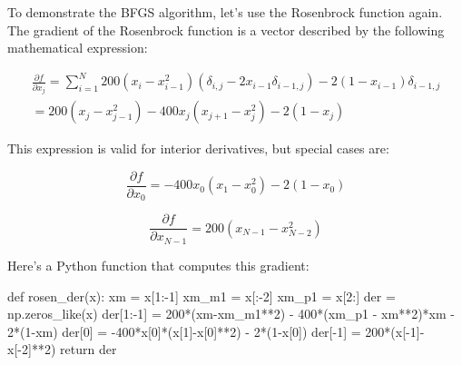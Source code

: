 \documentclass[
  letterpaper,
  DIV=11,
  numbers=noendperiod]{scrreprt}
\newenvironment{Shaded}{\begin{snugshade}}{\end{snugshade}}
\newcommand{\ControlFlowTok}[1]{\textcolor[rgb]{0.00,0.23,0.31}{#1}}
\newcommand{\DecValTok}[1]{\textcolor[rgb]{0.68,0.00,0.00}{#1}}
\newcommand{\KeywordTok}[1]{\textcolor[rgb]{0.00,0.23,0.31}{#1}}
\newcommand{\NormalTok}[1]{\textcolor[rgb]{0.00,0.23,0.31}{#1}}
\newcommand{\OperatorTok}[1]{\textcolor[rgb]{0.37,0.37,0.37}{#1}}
\begin{document}
To demonstrate the BFGS algorithm, let's use the Rosenbrock function
again. The gradient of the Rosenbrock function is a vector described by
the following mathematical expression:

\begin{align}
\frac{\partial f}{\partial x_j} = \sum_{i=1}^{N} 200(x_i - x_{i-1}^2)(\delta_{i,j} - 2x_{i-1}\delta_{i-1,j}) - 2(1 - x_{i-1})\delta_{i-1,j} \\
= 200(x_j - x_{j-1}^2) - 400x_j(x_{j+1} - x_j^2) - 2(1 - x_j)
\end{align}

This expression is valid for interior derivatives, but special cases
are:

\[
\frac{\partial f}{\partial x_0} = -400x_0(x_1 - x_0^2) - 2(1 - x_0)
\]

\[
\frac{\partial f}{\partial x_{N-1}} = 200(x_{N-1} - x_{N-2}^2)
\]

Here's a Python function that computes this gradient:

\begin{Shaded}
\begin{Highlighting}[]
\KeywordTok{def}\NormalTok{ rosen\_der(x):}
\NormalTok{    xm }\OperatorTok{=}\NormalTok{ x[}\DecValTok{1}\NormalTok{:}\OperatorTok{{-}}\DecValTok{1}\NormalTok{]}
\NormalTok{    xm\_m1 }\OperatorTok{=}\NormalTok{ x[:}\OperatorTok{{-}}\DecValTok{2}\NormalTok{]}
\NormalTok{    xm\_p1 }\OperatorTok{=}\NormalTok{ x[}\DecValTok{2}\NormalTok{:]}
\NormalTok{    der }\OperatorTok{=}\NormalTok{ np.zeros\_like(x)}
\NormalTok{    der[}\DecValTok{1}\NormalTok{:}\OperatorTok{{-}}\DecValTok{1}\NormalTok{] }\OperatorTok{=} \DecValTok{200}\OperatorTok{*}\NormalTok{(xm}\OperatorTok{{-}}\NormalTok{xm\_m1}\OperatorTok{**}\DecValTok{2}\NormalTok{) }\OperatorTok{{-}} \DecValTok{400}\OperatorTok{*}\NormalTok{(xm\_p1 }\OperatorTok{{-}}\NormalTok{ xm}\OperatorTok{**}\DecValTok{2}\NormalTok{)}\OperatorTok{*}\NormalTok{xm }\OperatorTok{{-}} \DecValTok{2}\OperatorTok{*}\NormalTok{(}\DecValTok{1}\OperatorTok{{-}}\NormalTok{xm)}
\NormalTok{    der[}\DecValTok{0}\NormalTok{] }\OperatorTok{=} \OperatorTok{{-}}\DecValTok{400}\OperatorTok{*}\NormalTok{x[}\DecValTok{0}\NormalTok{]}\OperatorTok{*}\NormalTok{(x[}\DecValTok{1}\NormalTok{]}\OperatorTok{{-}}\NormalTok{x[}\DecValTok{0}\NormalTok{]}\OperatorTok{**}\DecValTok{2}\NormalTok{) }\OperatorTok{{-}} \DecValTok{2}\OperatorTok{*}\NormalTok{(}\DecValTok{1}\OperatorTok{{-}}\NormalTok{x[}\DecValTok{0}\NormalTok{])}
\NormalTok{    der[}\OperatorTok{{-}}\DecValTok{1}\NormalTok{] }\OperatorTok{=} \DecValTok{200}\OperatorTok{*}\NormalTok{(x[}\OperatorTok{{-}}\DecValTok{1}\NormalTok{]}\OperatorTok{{-}}\NormalTok{x[}\OperatorTok{{-}}\DecValTok{2}\NormalTok{]}\OperatorTok{**}\DecValTok{2}\NormalTok{)}
    \ControlFlowTok{return}\NormalTok{ der}
\end{Highlighting}
\end{Shaded}
\end{document}
